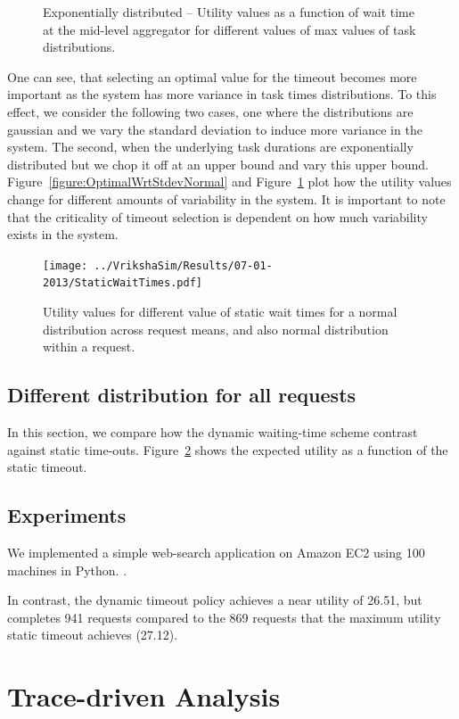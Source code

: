 \documentclass[letterpaper,twocolumn,10pt]{article}
\begin{document}
\begin{figure}[!t]
\centering
{}
\vspace{0.1in}
\caption{Exponentially distributed -- Utility values as a function of wait time at the mid-level aggregator for different values of max values of task distributions.}
\label{figure:OptimalWrtMaxValueExp}
\end{figure}
One can see, that selecting an optimal value for the timeout becomes more important as the system has more variance in task times distributions. To this effect, we consider the following two cases, one where the distributions are gaussian and we vary the standard deviation to induce more variance in the system. The second, when the underlying task durations are exponentially distributed but we chop it off at an upper bound and vary this upper bound. Figure~\ref{figure:OptimalWrtStdevNormal} and Figure~\ref{figure:OptimalWrtMaxValueExp} plot how the utility values change for different amounts of variability in the system. It is important to note that the criticality of timeout selection is dependent on how much variability exists in the system.

\begin{figure}[t]
\centering
\texttt{[image: ../VrikshaSim/Results/07-01-2013/StaticWaitTimes.pdf]}
\caption{Utility values for different value of static wait times for a normal distribution across request means, and also normal distribution within a request.}
\label{figure:StaticWaitTimes}
\end{figure}

\subsection{Different distribution for all requests}
In this section, we compare how the dynamic waiting-time scheme contrast against static time-outs. Figure~\ref{figure:StaticWaitTimes} shows the expected utility as a function of the static timeout.


\subsection{Experiments}
We implemented a simple web-search application on Amazon EC2 using 100 machines in Python.
.


In contrast, the dynamic timeout policy achieves a near utility of 26.51, but completes 941 requests compared to the 869 requests that the maximum utility static timeout achieves (27.12).

\section{Trace-driven Analysis}


{\footnotesize 
}


\theendnotes
\end{document}
